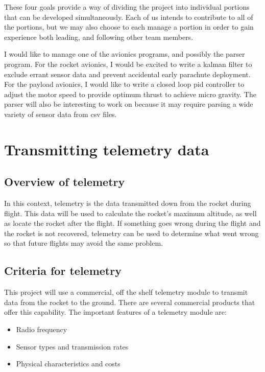 \documentclass[onecolumn, draftclsnofoot, 10pt, compsoc]{IEEEtran}
\begin{document}
These four goals provide a way of dividing the project into individual portions that can be developed simultaneously.  Each of us intends to contribute to all of the portions, but we may also choose to each manage a portion in order to gain experience both leading, and following other team members.

I would like to manage one of the avionics programs, and possibly the parser program.  For the rocket avionics, I would be excited to write a kalman filter to exclude errant sensor data and prevent accidental early parachute deployment.  For the payload avionics, I would like to write a closed loop pid controller to adjust the motor speed to provide optimum thrust to achieve micro gravity.  The parser will also be interesting to work on because it may require parsing a wide variety of sensor data from csv files.

\section{Transmitting telemetry data}

\subsection{Overview of telemetry}
In this context, telemetry is the data transmitted down from the rocket during flight.  This data will be used to calculate the rocket's maximum altitude, as well as locate the rocket after the flight.  If something goes wrong during the flight and the rocket is not recovered, telemetry can be used to determine what went wrong so that future flights may avoid the same problem.

\subsection{Criteria for telemetry}
This project will use a commercial, off the shelf telemetry module to transmit data from the rocket to the ground.  There are several commercial products that offer this capability.  The important features of a telemetry module are:

\begin{itemize}
	\item Radio frequency
    \item Sensor types and transmission rates
    \item Physical characteristics and costs
\end{itemize}
\end{document}
